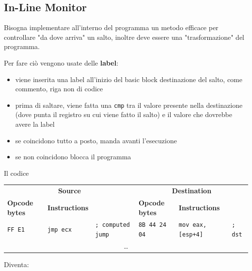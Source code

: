 \subsection{In-Line Monitor}

Bisogna implementare all'interno del programma un metodo efficace per controllare "da dove arriva" un salto, inoltre deve essere una "trasformazione" del programma. 

Per fare ciò vengono usate delle \textbf{label}:
\begin{itemize}
	\item viene inserita una label all'inizio del basic block destinazione del salto, come commento, riga non di codice

	\item prima di saltare, viene fatta una \texttt{cmp} tra il valore presente nella destinazione (dove punta il registro su cui viene fatto il salto) e il valore che dovrebbe avere la label

	\item se coincidono tutto a posto, manda avanti l'esecuzione

	\item se non coincidono blocca il programma
\end{itemize}

Il codice
\begin{table}[h]
	\centering
	\begin{adjustbox}{max width=\textwidth}
	\begin{tabular}{@{} lll | lll @{}}
		\multicolumn{3}{c}{\bfseries Source} & \multicolumn{3}{c}{\bfseries Destination} \\
		\cmidrule(lr){1-3} \cmidrule(l){4-6}
		\bfseries Opcode bytes & \bfseries Instructions &
		& \bfseries Opcode bytes & \bfseries Instructions & \\
		\midrule
		\texttt{FF E1} & \texttt{jmp ecx} & \texttt{; computed jump}
		& \texttt{8B 44 24 04} & \texttt{mov eax, [esp+4]} & \texttt{; dst} \\
		\multicolumn{6}{c}{\dots} \\
	\end{tabular}
	\end{adjustbox}
\end{table}

Diventa:

